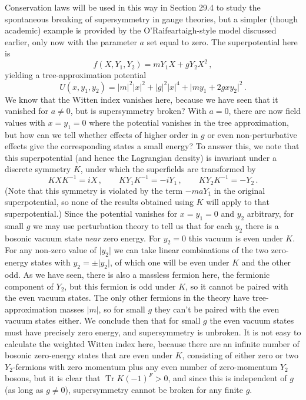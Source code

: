 Conservation laws will be used in this way in Section 29.4 to study the
spontaneous breaking of supersymmetry in gauge theories, but a simpler
(though academic) example is provided by the O'Raifeartaigh-style model
discussed earlier, only now with the parameter \(a\) set equal to zero.
The superpotential here is
\begin{equation}
  f(X,Y_1,Y_2)=mY_1X+gY_2X^2\,,
  \tag{29.1.8}\label{eq:29.1.8}
\end{equation}
yielding a tree-approximation potential
\begin{equation}
  U(x,y_1,y_2)
  =
  \lvert m\rvert^2\lvert x\rvert^2
  +\lvert g\rvert^2\lvert x\rvert^4
  +\lvert my_1+2gxy_2\rvert^2\,.
  \tag{29.1.9}\label{eq:29.1.9}
\end{equation}
We know that the Witten index vanishes here, because we have seen that it
vanished for \(a\ne0\), but is supersymmetry broken? With \(a=0\), there
are now field values with \(x=y_1=0\) where the potential vanishes in the
tree approximation, but how can we tell whether effects of higher order
in \(g\) or even non-perturbative effects give the corresponding states a
small energy? To answer this, we note that this superpotential (and hence
the Lagrangian density) is invariant under a discrete symmetry \(K\),
under which the superfields are transformed by
\begin{equation}
  KXK^{-1}=iX\,,
  \qquad
  KY_1K^{-1}=-iY_1\,,
  \qquad
  KY_2K^{-1}=-Y_2\,.
  \tag{29.1.10}\label{eq:29.1.10}
\end{equation}
(Note that this symmetry is violated by the term \(-maY_1\) in the
original superpotential, so none of the results obtained using \(K\) will
apply to that superpotential.) Since the potential vanishes for
\(x=y_1=0\) and \(y_2\) arbitrary, for small \(g\) we may use
perturbation theory to tell us that for each \(y_2\) there is a bosonic
vacuum state \emph{near} zero energy. For \(y_2=0\) this vacuum is even
under \(K\). For any non-zero value of \(\lvert y_2\rvert\) we can take
linear combinations of the two zero-energy states with
\(y_2=\pm\lvert y_2\rvert\), of which one will be even under \(K\) and
the other odd. As we have seen, there is also a massless fermion here,
the fermionic component of \(Y_2\), but this fermion is odd under \(K\),
so it cannot be paired with the even vacuum states. The only other
fermions in the theory have tree-approximation masses \(\lvert m\rvert\),
so for small \(g\) they can't be paired with the even vacuum states
either. We conclude then that for small \(g\) the even vacuum states must
have precisely zero energy, and supersymmetry is unbroken. It is not easy
to calculate the weighted Witten index here, because there are an infinite
number of bosonic zero-energy states that are even under \(K\), consisting
of either zero or two \(Y_2\)-fermions with zero momentum plus any even
number of zero-momentum \(Y_2\) bosons, but it is clear that
\(\operatorname{Tr}K(-1)^F>0\), and since this is independent of \(g\) (as
long as \(g\ne0\)), supersymmetry cannot be broken for any finite \(g\).
